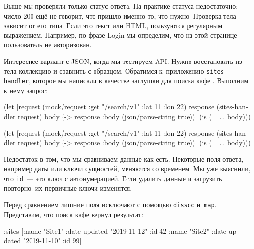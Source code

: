 Выше мы проверяли только статус ответа. На практике статуса недостаточно: число
200 ещё не говорит, что пришло именно то, что нужно. Проверка тела зависит от
его типа. Если это текст или HTML, пользуются регулярным выражением. Например,
по фразе Login мы определим, что на этой странице пользователь не авторизован.


Интереснее вариант с JSON, когда мы тестируем API. Нужно восстановить из тела
коллекцию и сравнить с образцом. Обратимся к~приложению \verb|sites-handler|,
которое мы написали в качестве заглушки для поиска кафе .
Выполним к нему запрос:

\ifnarrow

\begin{english}
  \begin{clojure}
(let [request (mock/request
                :get "/search/v1"
                {:lat 11 :lon 22})
      response (sites-handler request)
      body (-> response
               :body
               (json/parse-string
                 true))]
  (is (= {...} body)))
  \end{clojure}
\end{english}

\else

\begin{english}
  \begin{clojure}
(let [request (mock/request :get "/search/v1"
                            {:lat 11 :lon 22})
      response (sites-handler request)
      body (-> response
               :body
               (json/parse-string true))]
  (is (= {...} body)))
  \end{clojure}
\end{english}

\fi

Недостаток в том, что мы сравниваем данные как есть. Некоторые поля ответа,
например даты или ключи сущностей, меняются со временем. Мы уже выяснили, что
\verb|id|~--- это ключ с автонумерацией. Если удалить данные и загрузить
повторно, их первичные ключи изменятся.

Перед сравнением лишние поля исключают с помощью \verb|dissoc|
и~\verb|map|. Представим, что поиск кафе вернул результат:

\begin{english}
  \begin{clojure}
{:sites [{:name "Site1"
          :date-updated "2019-11-12"
          :id 42}
         {:name "Site2"
          :date-updated "2019-11-10"
          :id 99}]}
  \end{clojure}
\end{english}

